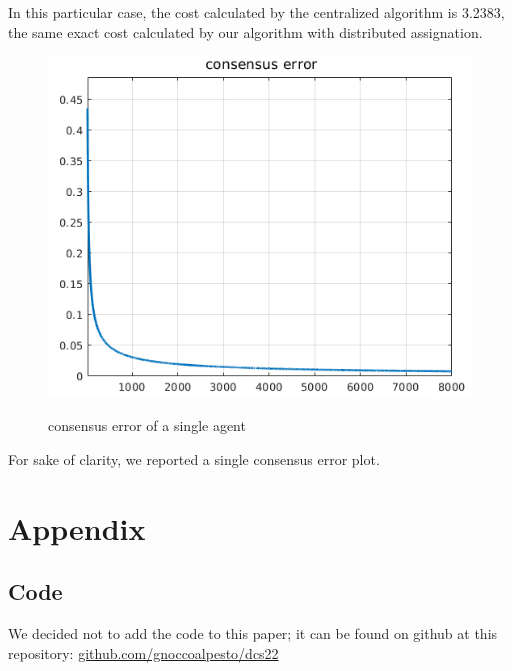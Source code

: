 \documentclass{article}
\begin{document}
In this particular case, the cost calculated by the centralized algorithm is 3.2383, the same exact cost calculated by our algorithm with distributed assignation.


\begin{figure}[h!]
\centering
\caption{consensus error of a single agent}
 \includegraphics[scale=.45]{images/single_consensus.jpg}
\label{fig: consensus plot}
\end{figure}
\newpage
For sake of clarity, we reported a single consensus error plot.


\newpage
\section{Appendix}
\subsection{Code}
We decided not to add the code to this paper; it can be found on github at this repository: \href{https://github.com/gnoccoalpesto/dcs22}{github.com/gnoccoalpesto/dcs22}



\end{document}
